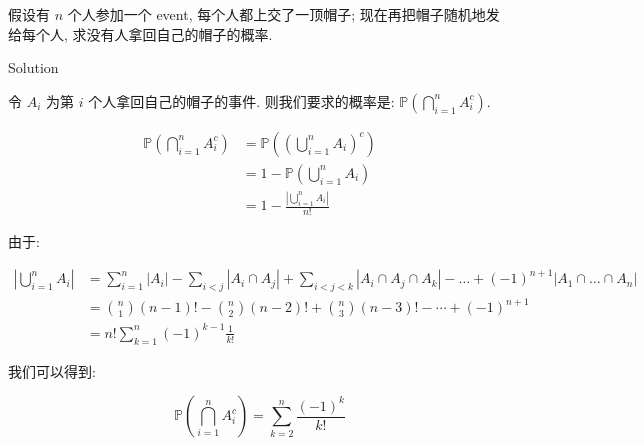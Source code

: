 \begin{example}

假设有 \(\mathit{n}\) 个人参加一个 event, 每个人都上交了一顶帽子; 现在再把帽子随机地发给每个人, 求没有人拿回自己的帽子的概率.

\begin{qlsolution}{Solution}

令 \(\mathit{A}_{\mathit{i}}\) 为第 \(\mathit{i}\) 个人拿回自己的帽子的事件. 则我们要求的概率是: \(\mathbb{P}(\bigcap_{\mathit{i} = 1}^{\mathit{n}}\mathit{A}_{\mathit{i}}^{\mathit{c}})\).

\[\begin{matrix}
{\mathbb{P}(\bigcap\limits_{\mathit{i} = 1}^{\mathit{n}}\mathit{A}_{\mathit{i}}^{\mathit{c}})} & {= \mathbb{P}((\bigcup\limits_{\mathit{i} = 1}^{\mathit{n}}\mathit{A}_{\mathit{i}})^{\mathit{c}})} \\
 & {= 1 - \mathbb{P}(\bigcup\limits_{\mathit{i} = 1}^{\mathit{n}}\mathit{A}_{\mathit{i}})} \\
 & {= 1 - \frac{|\bigcup_{\mathit{i} = 1}^{\mathit{n}}\mathit{A}_{\mathit{i}}|}{\mathit{n}!}}
\end{matrix}\]

由于:

\[\begin{matrix}
{|\bigcup\limits_{\mathit{i} = 1}^{\mathit{n}}\mathit{A}_{\mathit{i}}|} & {= \sum\limits_{\mathit{i} = 1}^{\mathit{n}}\left| \mathit{A}_{\mathit{i}} \right| - \sum\limits_{\mathit{i} < \mathit{j}}\left| {\mathit{A}_{\mathit{i}} \cap \mathit{A}_{\mathit{j}}} \right| + \sum\limits_{\mathit{i} < \mathit{j} < \mathit{k}}\left| {\mathit{A}_{\mathit{i}} \cap \mathit{A}_{\mathit{j}} \cap \mathit{A}_{\mathit{k}}} \right| - \ldots + ( - 1)^{\mathit{n} + 1}\left| {\mathit{A}_{1} \cap \ldots \cap \mathit{A}_{\mathit{n}}} \right|} \\
 & {= \binom{\mathit{n}}{1}(\mathit{n} - 1)! - \binom{\mathit{n}}{2}(\mathit{n} - 2)! + \binom{\mathit{n}}{3}(\mathit{n} - 3)! - \cdots + ( - 1)^{\mathit{n} + 1}} \\
 & {= \mathit{n}!\sum\limits_{\mathit{k} = 1}^{\mathit{n}}( - 1)^{\mathit{k} - 1}\frac{1}{\mathit{k}!}}
\end{matrix}\]

我们可以得到:

\[\mathbb{P}(\bigcap\limits_{\mathit{i} = 1}^{\mathit{n}}\mathit{A}_{\mathit{i}}^{\mathit{c}}) = \sum\limits_{\mathit{k} = 2}^{\mathit{n}}\frac{( - 1)^{\mathit{k}}}{\mathit{k}!}\]

\end{qlsolution}

\end{example}

